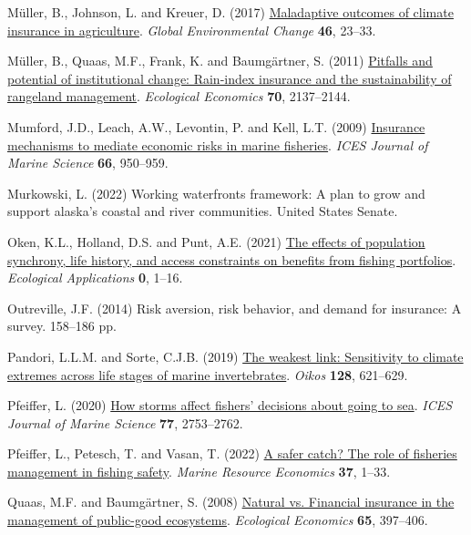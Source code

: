\documentclass[
  letterpaper,
  DIV=11,
  numbers=noendperiod]{scrartcl}
\newlength{\cslhangindent}
\newenvironment{CSLReferences}[2] %
 {\begin{list}{}{%
  \setlength{\itemindent}{0pt}
  \setlength{\leftmargin}{0pt}
  \setlength{\parsep}{0pt}
  \ifodd #1
   \setlength{\leftmargin}{\cslhangindent}
   \setlength{\itemindent}{-1\cslhangindent}
  \fi
  \setlength{\itemsep}{#2\baselineskip}}}
 {\end{list}}
\theoremstyle{plain}
\theoremstyle{plain}
\theoremstyle{remark}
\begin{document}
\begin{CSLReferences}{1}{0}
Müller, B., Johnson, L. and Kreuer, D. (2017)
\href{https://doi.org/10.1016/j.gloenvcha.2017.06.010}{Maladaptive
outcomes of climate insurance in agriculture}. \emph{Global
Environmental Change} \textbf{46}, 23--33.

Müller, B., Quaas, M.F., Frank, K. and Baumgärtner, S. (2011)
\href{https://doi.org/10.1016/j.ecolecon.2011.06.011}{Pitfalls and
potential of institutional change: Rain-index insurance and the
sustainability of rangeland management}. \emph{Ecological Economics}
\textbf{70}, 2137--2144.

Mumford, J.D., Leach, A.W., Levontin, P. and Kell, L.T. (2009)
\href{https://doi.org/10.1093/icesjms/fsp100}{Insurance mechanisms to
mediate economic risks in marine fisheries}. \emph{ICES Journal of
Marine Science} \textbf{66}, 950--959.

Murkowski, L. (2022) Working waterfronts framework: A plan to grow and
support alaska's coastal and river communities. United States Senate.

Oken, K.L., Holland, D.S. and Punt, A.E. (2021)
\href{https://doi.org/10.1002/eap.2307}{The effects of population
synchrony, life history, and access constraints on benefits from fishing
portfolios}. \emph{Ecological Applications} \textbf{0}, 1--16.

Outreville, J.F. (2014) Risk aversion, risk behavior, and demand for
insurance: A survey. 158--186 pp.

Pandori, L.L.M. and Sorte, C.J.B. (2019)
\href{https://doi.org/10.1111/oik.05886}{The weakest link: Sensitivity
to climate extremes across life stages of marine invertebrates}.
\emph{Oikos} \textbf{128}, 621--629.

Pfeiffer, L. (2020) \href{https://doi.org/10.1093/icesjms/fsaa145}{How
storms affect fishers' decisions about going to sea}. \emph{ICES Journal
of Marine Science} \textbf{77}, 2753--2762.

Pfeiffer, L., Petesch, T. and Vasan, T. (2022)
\href{https://doi.org/10.1086/716856}{A safer catch? The role of
fisheries management in fishing safety}. \emph{Marine Resource
Economics} \textbf{37}, 1--33.

Quaas, M.F. and Baumgärtner, S. (2008)
\href{https://doi.org/10.1016/j.ecolecon.2007.07.004}{Natural vs.
Financial insurance in the management of public-good ecosystems}.
\emph{Ecological Economics} \textbf{65}, 397--406.


\end{CSLReferences}
\end{document}
